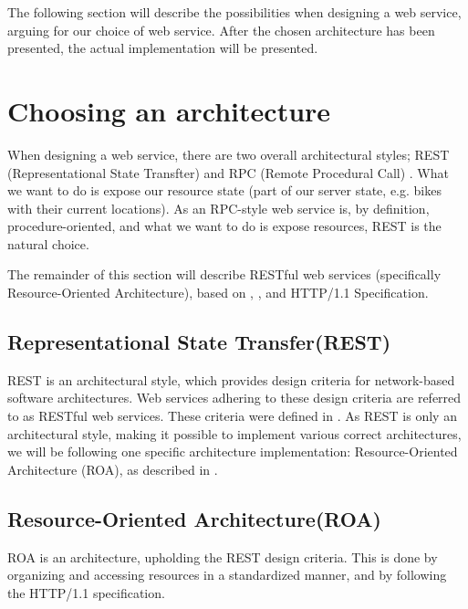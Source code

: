 The following section will describe the possibilities when designing a web service, arguing for our choice of web service.
After the chosen architecture has been presented, the actual implementation will be presented.

\section{Choosing an architecture}
When designing a web service, there are two overall architectural styles; REST (Representational State Transfter) and RPC (Remote Procedural Call) \cite{restful_web_services}.
What we want to do is expose our resource state (part of our server state, e.g. bikes with their current locations).
As an RPC-style web service is, by definition, procedure-oriented, and what we want to do is expose resources, REST is the natural choice.

The remainder of this section will describe RESTful web services (specifically Resource-Oriented Architecture), based on \citet{restful_web_services}, \citet{fielding_dissertation}, and HTTP/1.1 Specification\cite{http_specification}.

\subsection{Representational State Transfer(REST)}
REST is an architectural style, which provides design criteria for network-based software architectures.
Web services adhering to these design criteria are referred to as RESTful web services.
These criteria were defined in \citet{fielding_dissertation}.
As REST is only an architectural style, making it possible to implement various correct architectures, we will be following one specific architecture implementation: Resource-Oriented Architecture (ROA), as described in \citet{restful_web_services}.

\subsection{Resource-Oriented Architecture(ROA)}\label{webservice:roa}
ROA is an architecture, upholding the REST design criteria.
This is done by organizing and accessing resources in a standardized manner, and by following the HTTP/1.1 specification.

